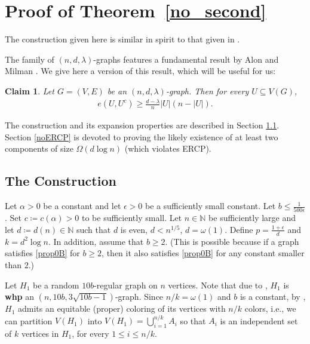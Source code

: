 \documentclass[notitlepage]{scrartcl}
\newtheorem{claim}[thm]{Claim}
\begin{document}
\section{Proof of Theorem~\ref{no_second}}\label{Pno_second}

The construction given here is similar in spirit to that given in \cite[Section 5.2]{diskin2024percolationisoperimetry}.

The family of $(n,d,\lambda)$-graphs features a fundamental result by Alon and Milman \cite{zbMATH03875335}. We give here a version of this result, which will be useful for us:

\begin{claim} \label{eml}
    Let $G = (V, E)$ be an $(n, d, \lambda)$-graph. Then for every $U\subseteq V(G)$,
    \begin{align*}
        e(U,U^c)\ge \frac{d-\lambda}{n}|U|(n-|U|).
    \end{align*}
\end{claim}

The construction and its expansion properties are described in Section \ref{construction}. Section \ref{noERCP} is devoted to proving the likely existence of at least two components of size $\Omega\left(d\log n\right)$ (which violates ERCP).

\subsection{The Construction}\label{construction}

Let $\alpha>0$ be a constant and let $\epsilon>0$ be a sufficiently small constant. Let $b\le \frac{1}{500\epsilon}$. Set $c\coloneqq c(\alpha)>0$ to be sufficiently small. Let $n\in \mathbb{N}$ be sufficiently large and let $d\coloneqq d(n)\in \mathbb{N}$ such that $d$ is even, $d<n^{1/5}$, $d=\omega(1)$. Define $p=\frac{1+\epsilon}{d}$ and $k=d^2\log n$. In addition, assume that $b\ge 2$. (This is possible because if a graph satisfies \ref{prop0B} for $b\ge 2$, then it also satisfies \ref{prop0B} for any constant smaller than $2$.)

Let $H_1$ be a random $10b$-regular graph on $n$ vertices. Note that due to \cite{zbMATH05315244}, $H_1$ is \textbf{whp} an $\left(n,10b,3\sqrt{10b-1}\right)$-graph. Since $n/k=\omega(1)$ and $b$ is a constant, by \cite{zbMATH03344609}, $H_1$ admits an equitable (proper) coloring of its vertices with $n/k$ colors, i.e., we can partition $V(H_1)$ into $V(H_1)=\bigcup_{i=1}^{n/k}A_i$ so that $A_i$ is an independent set of $k$ vertices in $H_1$, for every $1\le i\le n/k$.
\end{document}
